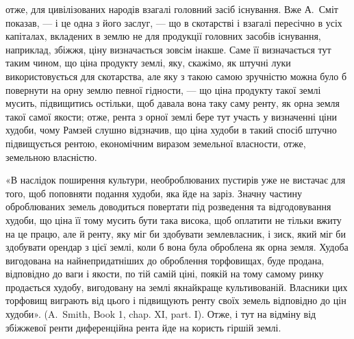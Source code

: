 \parcont{}  %
отже, для цивілізованих народів взагалі головний засіб існування. Вже А.~Сміт
показав, — і це одна з його заслуг, — що в скотарстві і взагалі пересічно в
усіх капіталах, вкладених в землю не для продукції головних засобів існування,
наприклад, збіжжя, ціну визначається зовсім інакше. Саме її визначається
тут таким чином, що ціна продукту землі, яку, скажімо, як штучні луки використовується
для скотарства, але яку з такою самою зручністю можна було б
повернути на орну землю певної гідности, — що ціна продукту такої землі мусить,
підвищитись остільки, щоб давала вона таку саму ренту, як орна земля такої
самої якости; отже, рента з орної землі бере тут участь у визначенні ціни худоби,
чому Рамзей слушно відзначив, що ціна худоби в такий спосіб штучно
підвищується рентою, економічним виразом земельної власности, отже, земельною
власністю.

«В наслідок поширення культури, необроблюваних пустирів уже не вистачає
для того, щоб поповняти подання худоби, яка йде на заріз. Значну частину
оброблюваних земель доводиться повертати під розведення та відгодовування
худоби, що ціна її тому мусить бути така висока, щоб оплатити не
тільки вжиту на це працю, але й ренту, яку міг би здобувати землевласник,
і зиск, який міг би здобувати орендар з цієї землі, коли б вона була
оброблена як орна земля. Худоба вигодована на найнепридатніших до оброблення
торфовищах, буде продана, відповідно до ваги і якости, по тій самій ціні, поякій
на тому самому ринку продається худобу, вигодовану на землі якнайкраще
культивованій. Власники цих торфовищ виграють від цього і підвищують ренту
своїх земель відповідно до цін худоби». (A.~Smith, Book 1, chap. XI, part. I).
Отже, і тут на відміну від збіжжевої ренти диференційна рента йде на користь
гіршій землі.

